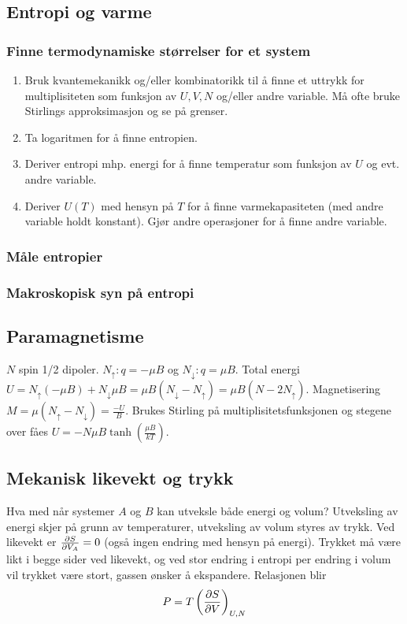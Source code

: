 \documentclass[12pt]{article}
\begin{document}
\subsection{Entropi og varme}
\subsubsection{Finne termodynamiske størrelser for et system}
\begin{enumerate}
  \itemsep0em
  \item Bruk kvantemekanikk og/eller kombinatorikk til å finne et uttrykk for
  multiplisiteten som funksjon av $U,V,N$ og/eller andre variable. Må ofte bruke
  Stirlings approksimasjon og se på grenser.
  \item Ta logaritmen for å finne entropien.
  \item Deriver entropi mhp. energi for å finne temperatur som funksjon av $U$
  og evt. andre variable.
  \item Deriver $U(T)$ med hensyn på $T$ for å finne varmekapasiteten (med andre
  variable holdt konstant). Gjør andre operasjoner for å finne andre variable.
\end{enumerate}
\subsubsection{Måle entropier}
\subsubsection{Makroskopisk syn på entropi}
\subsection{Paramagnetisme}
$N$ spin 1/2 dipoler. $N_\uparrow: q = -\mu B$ og $N_\downarrow: q = \mu B$.
Total energi $U = N_\uparrow(-\mu B) + N_\downarrow \mu B = \mu B(N_\downarrow - N_\uparrow) = \mu B(N - 2N_\uparrow)$.
Magnetisering $M = \mu(N_\uparrow - N_\downarrow) = \frac{-U}{B}$. Brukes Stirling
på multiplisitetsfunksjonen og stegene over fåes $U = -N\mu B\tanh{\left(\frac{\mu B}{kT} \right)}$.
\subsection{Mekanisk likevekt og trykk}
Hva med når systemer $A$ og $B$ kan utveksle både energi og volum? Utveksling av
energi skjer på grunn av temperaturer, utveksling av volum styres av trykk.
Ved likevekt er $\pdv{S}{V_A} = 0$ (også ingen endring med hensyn på energi). Trykket
må være likt i begge sider ved likevekt, og ved stor endring i entropi per endring i
volum vil trykket være stort, gassen ønsker å ekspandere. Relasjonen blir
\begin{align*}
  P = T \left( \pdv{S}{V} \right)_{U,N}
\end{align*}
\end{document}
